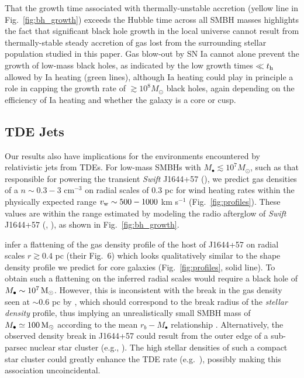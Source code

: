 \documentclass[usenatbib,fleqn]{mn2e}
\newcommand{\Mbh}[1][]{M_{\bullet#1}}
\begin{document}
That the growth time associated with thermally-unstable accretion
(yellow line in Fig.~\ref{fig:bh_growth}) exceeds the Hubble time
across all SMBH masses highlights the fact that significant black hole
growth in the local universe cannot result from thermally-stable
steady accretion of gas lost from the surrounding stellar population
studied in this paper.  Gas blow-out by SN Ia cannot alone prevent the
growth of low-mass black holes, as indicated by the low growth times
$\ll t_{\rm h}$ allowed by Ia heating (green lines), although Ia
heating could play in principle a role in capping the growth rate of
$\gtrsim 10^{8}M_{\odot}$ black holes, again depending on the
efficiency of Ia heating and whether the galaxy is a core or cusp.


\subsection{TDE Jets}
\label{sec:TDE}

Our results also have implications for the environments encountered by
relativistic jets from TDEs.  For low-mass SMBHs with $M_{\bullet}
\lesssim 10^{7}M_{\odot}$, such as that responsible for powering the
transient {\it Swift} J1644+57 (\citealt{Bloom+11}), we predict gas
densities of a $n \sim 0.3-3$ cm$^{-3}$ on radial scales of 0.3 pc for
wind heating rates within the physically expected range $v_{\rm w}
\sim 500-1000$ km s$^{-1}$ (Fig.~\ref{fig:profiles}).  These values
are within the range estimated by modeling the radio afterglow of {\it
  Swift} J1644+57 (\citealt{Metzger+12},
\citealt{BergerZauderer+:2012a}), as shown in
Fig.~\ref{fig:bh_growth}.

\citet{BergerZauderer+:2012a} infer a flattening of the gas density
profile of the host of J1644+57 on radial scales $r \gtrsim 0.4$ pc
(their Fig.~6) which looks qualitatively similar to the shape density
profile we predict for core galaxies (Fig.~\ref{fig:profiles}, solid
line).  To obtain such a flattening on the inferred radial scales
would require a black hole of $\Mbh\sim 10^7 \Msun$.  However, this is
inconsistent with the break in the gas density seen at $\sim 0.6$ pc
by \citet{BergerZauderer+:2012a}, which should correspond to the break
radius of the {\it stellar density} profile, thus implying an
unrealistically small SMBH mass of $\Mbh\simeq 100\Msun$ according to
the mean $r_b-M_{\bullet}$ relationship \citep{LauerFaber+:2007a}.
Alternatively, the observed density break in J1644+57 could result
from the outer edge of a sub-parsec nuclear star cluster (e.g.,
\citealt{Carson+15}).  The high stellar densities of such a compact
star cluster could greatly enhance the TDE rate
(e.g.~\citealt{Stone&Metzger15}), possibly making this association
uncoincidental.
\end{document}
